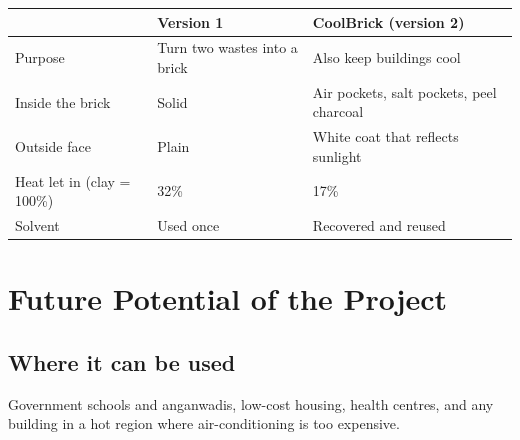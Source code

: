 \documentclass[11pt,a4paper]{article}
\let\origsection\section
\renewcommand{\section}{\clearpage\origsection}
\begin{document}
\begin{center}
\begin{tabularx}{\textwidth}{@{}l X X@{}}
\toprule
 & Version 1 & CoolBrick (version 2) \\
\midrule
Purpose & Turn two wastes into a brick & Also keep buildings cool \\
Inside the brick & Solid & Air pockets, salt pockets, peel charcoal \\
Outside face & Plain & White coat that reflects sunlight \\
Heat let in (clay = 100\%) & 32\% & 17\% \\
Solvent & Used once & Recovered and reused \\
\bottomrule
\end{tabularx}
\end{center}

\section{Future Potential of the Project}

\subsection{Where it can be used}
Government schools and anganwadis, low-cost housing, health centres, and
any building in a hot region where air-conditioning is too expensive.
\end{document}
